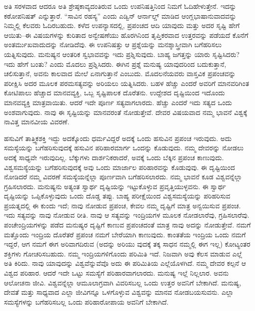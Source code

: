 ಅತಿ ಸರಳವಾದ ಆದರೂ ಅತಿ ಶ್ರೇಷ್ಠಕಾವ್ಯದಂತಿರುವ ಒಂದು ಉಪನಿಷತ್ತಿನಿಂದ ನಿಮಗೆ ಓದಿಹೇಳುತ್ತೇನೆ. ಇದನ್ನು ಕಠೋಪನಿಷತ್​ ಎನ್ನುತ್ತಾರೆ. “ಸಾವಿನ ರಹಸ್ಯ” ಎಂದು ಎಡ್ವಿನ್​ ಆರ್ನಾಲ್ಡ್​ ಮಾಡಿದ ಆಂಗ್ಲಭಾಷಾನುವಾದವನ್ನು ನಿಮ್ಮಲ್ಲಿ ಕೆಲವರು ಓದಿರಬಹುದು. ಕಳೆದ ಉಪನ್ಯಾಸದಲ್ಲಿ, ಪ್ರಪಂಚದ ಆದಿ ಯಾವುದು ಮತ್ತು ಅದರ ಸೃಷ್ಟಿ ಹೇಗೆ ಆಯಿತು–ಈ ವಿಷಯಗಳನ್ನು ಕುರಿತಾದ ಅನ್ವೇಷಣೆಯು ಹೊರಗಿನಿಂದ ತೃಪ್ತಿಕರವಾದ ಉತ್ತರವನ್ನು ಪಡೆಯದೆ ಕೊನೆಗೆ ಅಂತರ್ಮುಖವಾದುದನ್ನು ನೋಡಿದೆವು. ಈ ಉಪನಿಷತ್ತು ಆ ಪ್ರಶ್ನೆಯನ್ನು ಮನಶ್ಶಾಸ್ತ್ರೀವಾಗಿ ಬಗೆಹರಿಸಲು ಯತ್ನಿಸುವುದು. ಮನುಷ್ಯನ ಆಂತರಿಕ ಸ್ವಭಾವವನ್ನು ಇದು ಪ್ರಶ್ನಿಸುವುದು. ಬಾಹ್ಯ ಜಗತ್ತನ್ನು ಯಾರು ಸೃಷ್ಟಿಸಿದರು? ಇದು ಹೇಗೆ ಬಂತು? ಎಂದು ಮೊದಲು ಪ್ರಶ್ನಿಸಿದರು. ಈಗಿನ ಪ್ರಶ್ನೆ ಮನುಷ್ಯ ಯಾವುದರಿಂದ ಬದುಕುತ್ತಾನೆ, ಚಲಿಸುತ್ತಾನೆ, ಅವನು ಕಾಲವಾದ ಮೇಲೆ ಏನಾಗುತ್ತಾನೆ ಎಂಬುದು. ಮೊದಲನೆಯವರು ವಾಸ್ತವಿಕ ಪ್ರಪಂಚವನ್ನು ಪರೀಕ್ಷಿಸಿ ಅದರ ಮೂಲಕ ಪರಮಸತ್ಯವನ್ನು ಅರಿಯಲು ಯತ್ನಿಸಿದರು. ಬಹಳ ಹೆಚ್ಚು ಎಂದರೆ ಅವರಿಗೆ ಮಾನವರಿಗಿಂತ ಕೋಟಿಪಾಲು ಹೆಚ್ಚಾದ ಮಾನವವ್ಯಕ್ತಿ, ಒಬ್ಬ ಸೃಷ್ಟಿಪಾಲಕ ದೊರೆತನು. ಉದ್ದೇಶದ ದೃಷ್ಟಿಯಿಂದ ಇದೊಂದು ಮಾನವವ್ಯಕ್ತಿ ಮಾತ್ರವಾಯಿತು. ಆದರೆ ಇದೇ ಪೂರ್ಣ ಸತ್ಯವಾಗಲಾರದು. ಹೆಚ್ಚು ಎಂದರೆ ಇದು ಸತ್ಯದ ಒಂದು ಅಂಶವಾಗುವುದು. ನಾವು ಈ ಸೃಷ್ಟಿಯನ್ನು ಮಾನವರಂತೆ ನೋಡುತ್ತೇವೆ. ದೇವರ ವಿಷಯವಾದ ನಮ್ಮ ಭಾವನೆ ವಿಶ್ವಕ್ಕೆ ನಾವಿತ್ತ ಮಾನವೀಯ ವಿವರಣೆ.

\vskip 0.2cm 

ಹಸುವಿಗೆ ತಾತ್ತ್ವಿಕಶಕ್ತಿ ಇದ್ದು ಅದಕ್ಕೊಂದು ಧರ್ಮವಿದ್ದರೆ ಅದಕ್ಕೆ ಒಂದು ಹಸುವಿನ ಪ್ರಪಂಚ ಇರುವುದು. ಅದು ಸಮಸ್ಯೆಯನ್ನು ಬಗೆಹರಿಸುವುದಕ್ಕೆ ಹಸುವಿನ ಪರಿಹಾರಮಾರ್ಗ ಒಂದನ್ನು ಕೊಡುವುದು. ನಮ್ಮ ದೇವರನ್ನು ನೋಡಲು ಅದಕ್ಕೆ ಸಾಧ್ಯವೇ ಇರುವುದಿಲ್ಲ. ಬೆಕ್ಕುಗಳು ದಾರ್ಶನಿಕರಾದರೆ, ಅವಕ್ಕೆ ಒಂದು ಬೆಕ್ಕಿನ ಪ್ರಪಂಚ ಕಾಣುವುದು. ವಿಶ್ವಸಮಸ್ಯೆಯನ್ನು ಬಗೆಹರಿಸುವುದಕ್ಕೆ ಅವು ಒಂದು ಮಾರ್ಜಾಲ ಪರಿಹಾರವನ್ನು ಕೊಡುವುವು. ಈ ದೃಷ್ಟಿಯಿಂದ ನೋಡಿದರೆ ನಮ್ಮ ವಿವರಣೆ ಸಮಸ್ಯೆಯನ್ನೆಲ್ಲಾ ಪೂರ್ಣವಾಗಿ ಬಗೆಹರಿಸಲಾರದು. ನಮ್ಮ ಭಾವನೆ ಕೂಡ ವಿಶ್ವವನ್ನೆಲ್ಲಾ ಗ್ರಹಿಸಲಾರದು. ಮನುಷ್ಯನು ಅತ್ಯಂತ ಸ್ವಾರ್ಥ ದೃಷ್ಟಿಯನ್ನು ಇಟ್ಟುಕೊಳ್ಳುವ ಪ್ರವೃತ್ತಿಯುಳ್ಳವನು. ಈ ಸ್ವಾರ್ಥ ದೃಷ್ಟಿಯನ್ನು ಒಪ್ಪಿಕೊಳ್ಳುವುದು ಒಂದು ದೊಡ್ಡ ತಪ್ಪು. ಬಾಹ್ಯ ಪರೀಕ್ಷೆಯಿಂದ ವಿಶ್ವಸಮಸ್ಯೆಯನ್ನು ಪರಿಹರಿಸುವ ಪ್ರಯತ್ನದಲ್ಲಿ ಈ ಕುಂದು ಇದೆ; ನಾವು ನೋಡುವ ಪ್ರಪಂಚ, ಕೇವಲ ನಮ್ಮ ದೃಷ್ಟಿಗೆ ಮಾತ್ರ ಅನ್ವಯಿಸುವ ಪ್ರಪಂಚ. ಇದು ಸತ್ಯವನ್ನು ನಾವು ನೋಡುವ ರೀತಿ. ನಾವು ಆ ಸತ್ಯವನ್ನು ಇಂದ್ರಿಯಗಳ ಮೂಲಕ ನೋಡಲಾರೆವು, ಗ್ರಹಿಸಲಾರೆವು. ಪಂಚೇಂದ್ರಿಯಗಳನ್ನು ಪಡೆದ ಮನುಷ್ಯರ ದೃಷ್ಟಿಗೆ ಕಾಣುವ ಪ್ರಪಂಚದಂತೆ ಮಾತ್ರ ನಾವು ಅದನ್ನು ನೋಡುತ್ತೇವೆ. ನಮಗೆ ಮತ್ತೊಂದು ಇಂದ್ರಿಯ ದೊರೆತರೆ ಪ್ರಪಂಚ ನಮಗೆ ಬೇರೆಯಾಗಿ ಕಾಣುವುದು. ಕಾಂತತೆಯ ಇಂದ್ರಿಯ ಒಂದು ನಮಗೆ ಇದ್ದರೆ, ಆಗ ನಮಗೆ ಈಗ ಅರಿವಾಗದಿರುವ (ಅದನ್ನು ಅರಿಯು ವುದಕ್ಕೆ ತಕ್ಕ ಸಾಧನ ನಮ್ಮಲ್ಲಿ ಈಗ ಇಲ್ಲ) ಕೋಟ್ಯಂತರ ಶಕ್ತಿಗಳು ಗೋಚರಿಸಬಹುದು. ನಮ್ಮ ಇಂದ್ರಿಯಗಳಿಗೊಂದು ಪರಿಮಿತಿ ಇದೆ. ನಿಜವಾಗಿ ಅವು ಕೆಲಸ ಮಾಡುವ ಎಲ್ಲೆ ಅತಿ ಕಿರಿದು. ನಾವು ಯಾವುದನ್ನು ವಿಶ್ವವೆನ್ನುವೆವೊ ಅದು ಈ ಪರಿಮಿತಿಯ ಎಲ್ಲೆಯೊಳಗಿದೆ. ನಮ್ಮ ದೇವರ ಕಲ್ಪನೆ ಆ ವಿಶ್ವದ ಪರಿಹಾರ. ಆದರೆ ಇದೇ ಒಟ್ಟು ಸಮಸ್ಯೆಗೆ ಪರಿಹಾರವಾಗಲಾರದು. ಮನುಷ್ಯ ಇಲ್ಲೆ ನಿಲ್ಲಲಾರ. ಅವನು ಆಲೋಚನಾ ಜೀವಿ. ವಿಶ್ವವನ್ನೆಲ್ಲಾ ಆಮೂಲಾಗ್ರವಾಗಿ ವಿವರಿಸಬಲ್ಲ ಒಂದು ಉತ್ತರ ಅವನಿಗೆ ಬೇಕಾಗಿದೆ. ಮನುಷ್ಯ, ದೇವತೆ ಮತ್ತು ಸಾಧ್ಯವಾದ ಎಲ್ಲಾ ಜೀವಿಗನ್ನೂ ಒಳಗೊಳ್ಳುವ ವಿಶ್ವವನ್ನು ಮಾನವ ನೋಡಬಯಸುವನು. ಎಲ್ಲಾ ಸಮಸ್ಯೆಗಳನ್ನು ಬಗೆಹರಿಸಬಲ್ಲ ಒಂದು ಪರಿಹಾರೋಪಾಯ ಅವನಿಗೆ ಬೇಕಾಗಿದೆ.

